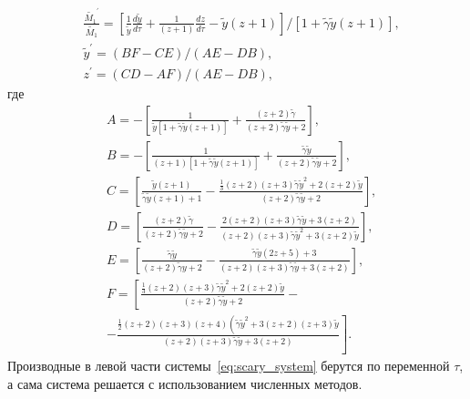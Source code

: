 \begin{equation} \label{eq:scary_system}
	\begin{aligned}
		&\frac{\tilde{M_1}^{\prime}}{\tilde{M_1}}=\left[\frac{1}{\tilde{y}} \frac{d \tilde{y}}{d \tau}+\frac{1}{(z+1)} \frac{d z}{d \tau}-\tilde{y}(z+1)\right] /[1+\tilde{\gamma} \tilde{y}(z+1)], \\
		&\tilde{y}^{\prime}=(B F-C E) /(A E-D B), \\
		&z^{\prime}=(C D-A F) /(A E-D B),
	\end{aligned}
\end{equation}
где
\begin{equation}
	\begin{aligned}
		&A=-\left[\frac{1}{\tilde{y}[1+\tilde{\gamma} \tilde{y}(z+1)]}+\frac{(z+2) \tilde{\gamma}}{(z+2) \tilde{\gamma} \tilde{y}+2}\right], \\
		&B=-\left[\frac{1}{(z+1)[1+\tilde{\gamma} \tilde{y}(z+1)]}+\frac{\tilde{\gamma} \tilde{y}}{(z+2) \tilde{\gamma} \tilde{y}+2}\right], \\
		&C=\left[\frac{\tilde{y}(z+1)}{\tilde{\gamma} \tilde{y}(z+1)+1}-\frac{\frac{1}{3}(z+2)(z+3) \tilde{\gamma} \tilde{y}^2+2(z+2) \tilde{y}}{(z+2) \tilde{\gamma} \tilde{y}+2}\right], \\
		&D=\left[\frac{(z+2) \tilde{\gamma}}{(z+2) \tilde{\gamma} \tilde{y}+2}-\frac{2(z+2)(z+3) \tilde{\gamma} \tilde{y}+3(z+2)}{(z+2)(z+3) \tilde{\gamma} \tilde{y}^2+3(z+2) \tilde{y}}\right], \\
		&E=\left[\frac{\tilde{\gamma} \tilde{y}}{(z+2) \tilde{\gamma} y+2}-\frac{\tilde{\gamma} \tilde{y}(2 z+5)+3}{(z+2)(z+3) \tilde{\gamma} \tilde{y}+3(z+2)}\right], \\
		&F=\left[\frac{\frac{1}{3}(z+2)(z+3) \tilde{\gamma} \tilde{y}^2+2(z+2) \tilde{y}}{(z+2) \tilde{\gamma} \tilde{y}+2}-\right. \\
		&\left.-\frac{\frac{1}{2}(z+2)(z+3)(z+4)\left(\tilde{\gamma} \tilde{y}^2+3(z+2)(z+3) \tilde{y}\right.}{(z+2)(z+3) \tilde{\gamma} \tilde{y}+3(z+2)}\right].
	\end{aligned}
\end{equation}
Производные в левой части системы~\ref{eq:scary_system} берутся по переменной $\tau$, а сама система решается с использованием численных методов.






